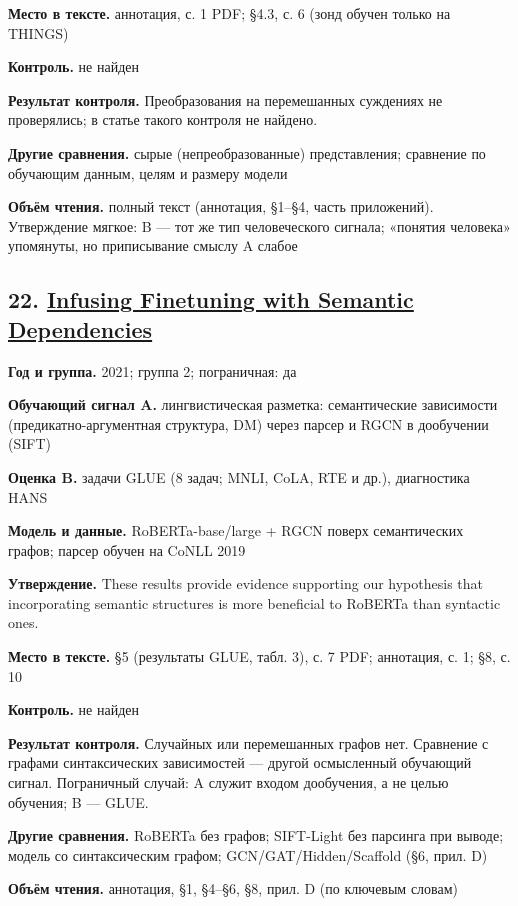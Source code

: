 \textbf{Место в тексте.} аннотация, с. 1 PDF; §4.3, с. 6 (зонд обучен только на THINGS)

\textbf{Контроль.} не найден

\textbf{Результат контроля.} Преобразования на перемешанных суждениях не проверялись; в статье такого контроля не найдено.

\textbf{Другие сравнения.} сырые (непреобразованные) представления; сравнение по обучающим данным, целям и размеру модели

\textbf{Объём чтения.} полный текст (аннотация, §1–§4, часть приложений). Утверждение мягкое: B — тот же тип человеческого сигнала; «понятия человека» упомянуты, но приписывание смыслу A слабое


\subsection*{22. \href{https://doi.org/10.1162/tacl_a_00363}{Infusing Finetuning with Semantic Dependencies}}

\textbf{Год и группа.} 2021; группа 2; пограничная: да

\textbf{Обучающий сигнал A.} лингвистическая разметка: семантические зависимости (предикатно-аргументная структура, DM) через парсер и RGCN в дообучении (SIFT)

\textbf{Оценка B.} задачи GLUE (8 задач; MNLI, CoLA, RTE и др.), диагностика HANS

\textbf{Модель и данные.} RoBERTa-base/large + RGCN поверх семантических графов; парсер обучен на CoNLL 2019

\textbf{Утверждение.} These results provide evidence supporting our hypothesis that incorporating semantic structures is more beneficial to RoBERTa than syntactic ones.

\textbf{Место в тексте.} §5 (результаты GLUE, табл. 3), с. 7 PDF; аннотация, с. 1; §8, с. 10

\textbf{Контроль.} не найден

\textbf{Результат контроля.} Случайных или перемешанных графов нет. Сравнение с графами синтаксических зависимостей — другой осмысленный обучающий сигнал. Пограничный случай: A служит входом дообучения, а не целью обучения; B — GLUE.

\textbf{Другие сравнения.} RoBERTa без графов; SIFT-Light без парсинга при выводе; модель со синтаксическим графом; GCN/GAT/Hidden/Scaffold (§6, прил. D)

\textbf{Объём чтения.} аннотация, §1, §4–§6, §8, прил. D (по ключевым словам)


